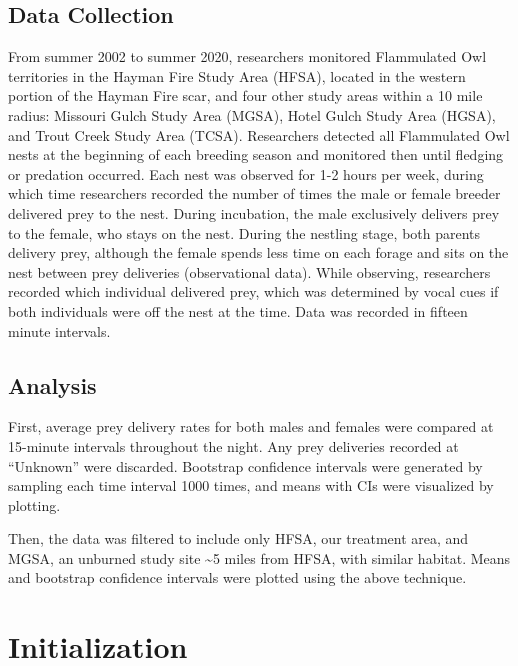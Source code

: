 \documentclass[]{article}
\begin{document}
\hypertarget{data-collection}{%
\subsection{Data Collection}\label{data-collection}}

From summer 2002 to summer 2020, researchers monitored Flammulated Owl
territories in the Hayman Fire Study Area (HFSA), located in the western
portion of the Hayman Fire scar, and four other study areas within a 10
mile radius: Missouri Gulch Study Area (MGSA), Hotel Gulch Study Area
(HGSA), and Trout Creek Study Area (TCSA). Researchers detected all
Flammulated Owl nests at the beginning of each breeding season and
monitored then until fledging or predation occurred. Each nest was
observed for 1-2 hours per week, during which time researchers recorded
the number of times the male or female breeder delivered prey to the
nest. During incubation, the male exclusively delivers prey to the
female, who stays on the nest. During the nestling stage, both parents
delivery prey, although the female spends less time on each forage and
sits on the nest between prey deliveries (observational data). While
observing, researchers recorded which individual delivered prey, which
was determined by vocal cues if both individuals were off the nest at
the time. Data was recorded in fifteen minute intervals.

\hypertarget{analysis}{%
\subsection{Analysis}\label{analysis}}

First, average prey delivery rates for both males and females were
compared at 15-minute intervals throughout the night. Any prey
deliveries recorded at ``Unknown'' were discarded. Bootstrap confidence
intervals were generated by sampling each time interval 1000 times, and
means with CIs were visualized by plotting.

Then, the data was filtered to include only HFSA, our treatment area,
and MGSA, an unburned study site \textasciitilde{}5 miles from HFSA,
with similar habitat. Means and bootstrap confidence intervals were
plotted using the above technique.

\hypertarget{initialization}{%
\section{Initialization}\label{initialization}}
\end{document}
